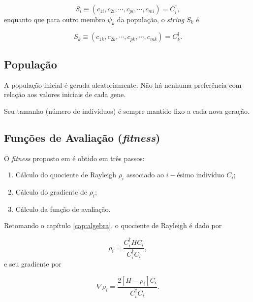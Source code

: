 	\begin{equation}
		S_i \equiv  (c_{1i}, c_{2i}, \cdots, c_{pi}, \cdots, c_{mi}) = C^{\dagger}_i,
	\end{equation}
	enquanto que para outro membro $\psi_k$ da população, o \emph{string} $S_k$ é
	
	\begin{equation}
		S_k \equiv  (c_{1k}, c_{2k}, \cdots, c_{pk}, \cdots, c_{mk}) = C^{\dagger}_k.
	\end{equation}
	
	\subsection{População}

	A população inicial é gerada aleatoriamente. Não há nenhuma preferência com relação aos valores iniciais de cada gene.
	
	Seu tamanho (número de indivíduos) é sempre mantido fixo a cada nova geração.
	
	\subsection{Funções de Avaliação (\emph{fitness})}
	\label{sec:fitness_metodo}

	O \emph{fitness} proposto em \cite{metodo2004} é obtido em três passos:
	
	\begin{enumerate}
		\item \label{item:passo1} Cálculo do quociente de Rayleigh $\rho_i$ associado ao $i-$ésimo indivíduo $C_i$;
		\item \label{item:passo2} Cálculo do gradiente de $\rho_i$;
		\item \label{item:passo3} Cálculo da função de avaliação.
	\end{enumerate}
	
	Retomando o capítulo \ref{cap:algebra}, o quociente de Rayleigh é dado por
	
	\begin{equation}
		\rho_i = \frac{C_i^\dagger H C_i}{C_i^\dagger C_i},
	\end{equation}
	e seu gradiente por
	
	\begin{equation}\label{eq:grad_rho_metodo}
		\nabla \rho_i = \frac{2[H - \rho_i]C_i}{C_i^\dagger C_i}.
	\end{equation}
		
